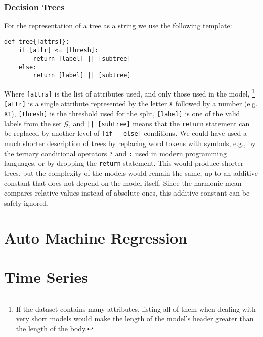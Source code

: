 \subsubsection*{Decision Trees}
\label{subsec:surfeit_decision_trees}

For the representation of a tree as a string we use the following template:

\begin{sourcecode}
{\scriptsize \begin{verbatim}
def tree{[attrs]}:
    if [attr] <= [thresh]:
        return [label] || [subtree]
    else:
        return [label] || [subtree]
\end{verbatim}}
\end{sourcecode}

Where \texttt{[attrs]} is the list of attributes used, and only those used in the model,%
\footnote{If the dataset contains many attributes, listing all of them when dealing with very short models would make the length of the model's header greater than the length of the body.}  \texttt{[attr]} is a single attribute represented by the letter \texttt{X} followed by a number (e.g. \texttt{X1}), \texttt{[thresh]} is the threshold used for the split, \texttt{[label]} is one of the valid labels from the set $\mathcal{G}$, and \texttt{|| [subtree]} means that the \texttt{return} statement can be replaced by another level of \texttt{[if - else]} conditions. We could have used a much shorter description of trees by replacing word tokens with symbols, e.g., by the ternary conditional operators \texttt{?} and \texttt{:} used in modern programming languages, or by dropping the \texttt{return} statement. This would produce shorter trees, but the complexity of the models would remain the same, up to an additive constant that does not depend on the model itself. Since the harmonic mean compares relative values instead of absolute ones, this additive constant can be safely ignored.



%
%

\section{Auto Machine Regression}


%
%

\section{Time Series}

